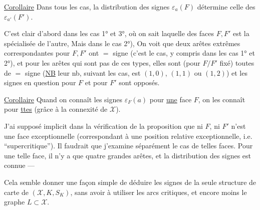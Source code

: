 
\uline{Corollaire} Dans tous les cas, la distribution des signes $\varepsilon_a(F)$ détermine celle des $\varepsilon_{a'}(F')$. 

C'est clair d'abord dans les cas 1° et 3°, où on sait laquelle des faces $F,F'$ est la spécialisée de l'autre,  Mais dans le cas  2°),  On voit que  deux  arêtes extrêmes correspondantes pour $F,F'$ ont $=$ signe (c'est  le cas, y compris dans les cas 1° et 2°), et pour les arêtes qui  sont pas de ces types, elles sont (pour $F/F'$ fixé) toutes de $=$ signe (\uline{NB} leur nb, suivant les cas, est $(1,0)$, $(1,1)$ ou $(1,2)$) et les signes en question pour $F$ et pour $F'$ sont opposés.

\uline{Corollaire} Quand on connaît les signes $\varepsilon_F(a)$ pour \uline{une} face $F$, on les connaît pour \uline{ttes} (grâce à la connexité de $\mathcal X$).

J'ai supposé implicit  dans la vérification de la proposition que ni $F$, ni $F'$ n'est une face exceptionnelle (correspondant à une position relative exceptionnelle, i.e. ``supercritique''). Il faudrait que j'examine séparément  le cas de telles faces. Pour une telle face, il n'y a que quatre grandes arêtes, et la distribution des signes est connue ---

Cela semble donner une façon simple de déduire les signes  de la seule structure de carte de $(\mathcal X,K,S_K)$, sans avoir à utiliser les arcs critiques, et encore moins  le  graphe $L\subset\mathcal X$.
